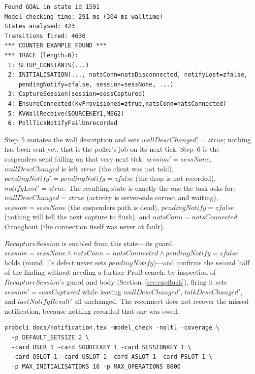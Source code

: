 \documentclass[a4paper,10pt,fleqn]{article}
\begin{document}
\begin{verbatim}
Found GOAL in state id 1591
Model checking time: 291 ms (304 ms walltime)
States analysed: 423
Transitions fired: 4630
*** COUNTER EXAMPLE FOUND ***
*** TRACE (length=6):
 1: SETUP_CONSTANTS(...)
 2: INITIALISATION(..., natsConn=natsDisconnected, notifyLost=zfalse,
    pendingNotify=zfalse, session=sessNone, ...)
 3: CaptureSession(session=sessCaptured)
 4: EnsureConnected(kvProvisioned=ztrue,natsConn=natsConnected)
 5: KVWallReceive(SOURCEKEY1,MSG2)
 6: PollTickNotifyFailUnrecorded
\end{verbatim}

Step~5 mutates the wall description and sets $wallDescChanged' =
ztrue$; nothing has been sent yet, that is the poller's job on its
next tick.  Step~6 is the suspenders send failing on that very next
tick: $session' = sessNone$, $wallDescChanged$ is left $ztrue$ (the
client was not told), $pendingNotify' = pendingNotify = zfalse$ (the
drop is not recorded), $notifyLost' = ztrue$.  The resulting state is
exactly the one the task asks for: $wallDescChanged = ztrue$ (activity
is server-side correct and waiting), $session = sessNone$ (the
suspenders path is dead), $pendingNotify = zfalse$ (nothing will tell
the next capture to flush), and $natsConn = natsConnected$ throughout
(the connection itself was never at fault).

$RecaptureSession$ is enabled from this state---its guard $session =
sessNone \land natsConn = natsConnected \land pendingNotify = zfalse$
holds (round~1's defect never sets $pendingNotify$)---and confirms the
second half of the finding without needing a further ProB search: by
inspection of $RecaptureSession$'s guard and body
(Section~\ref{sec:capflush}), firing it sets $session' = sessCaptured$
while leaving $wallDescChanged'$, $talkDescChanged'$, and
$lastNotifyResult'$ all unchanged.  The reconnect does not recover the
missed notification, because nothing recorded that one was owed.

\begin{verbatim}
probcli docs/notification.tex -model_check -noltl -coverage \
  -p DEFAULT_SETSIZE 2 \
  -card USER 1 -card SOURCEKEY 1 -card SESSIONKEY 1 \
  -card QSLOT 1 -card USLOT 1 -card ASLOT 1 -card PSLOT 1 \
  -p MAX_INITIALISATIONS 16 -p MAX_OPERATIONS 8000
\end{verbatim}
\end{document}
